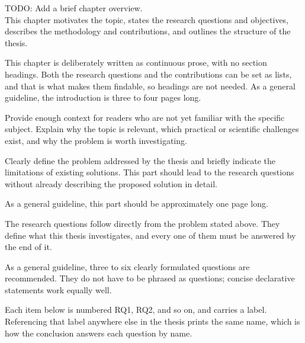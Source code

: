   {TODO: Add a brief chapter overview. \\
  This chapter motivates the topic, states the research questions and objectives, describes the methodology and contributions, and outlines the structure of the thesis.}

This chapter is deliberately written as continuous prose, with no section headings.
Both the research questions and the contributions can be set as lists, and that is what makes them findable, so headings are not needed.
As a general guideline, the introduction is three to four pages long.


Provide enough context for readers who are not yet familiar with the specific subject.
Explain why the topic is relevant, which practical or scientific challenges exist, and why the problem is worth investigating.

Clearly define the problem addressed by the thesis and briefly indicate the limitations of existing solutions.
This part should lead to the research questions without already describing the proposed solution in detail.

As a general guideline, this part should be approximately one page long.



The research questions follow directly from the problem stated above.
They define what this thesis investigates, and every one of them must be answered by the end of it.

As a general guideline, three to six clearly formulated questions are recommended.
They do not have to be phrased as questions; concise declarative statements work equally well.

Each item below is numbered RQ1, RQ2, and so on, and carries a label.
Referencing that label anywhere else in the thesis prints the same name, which is how the conclusion answers each question by name.


